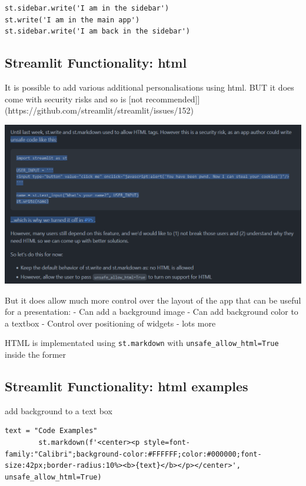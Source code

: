 \documentclass[
  letterpaper,
  DIV=11,
  numbers=noendperiod]{scrartcl}
\begin{document}
\begin{verbatim}
st.sidebar.write('I am in the sidebar')
st.write('I am in the main app')
st.sidebar.write('I am back in the sidebar')
\end{verbatim}

\hypertarget{streamlit-functionality-html}{%
\subsection{Streamlit Functionality:
html}\label{streamlit-functionality-html}}

It is possible to add various additional personalisations using html.
BUT it does come with security risks and so is {[}not
recommended{]}{]}(https://github.com/streamlit/streamlit/issues/152)

\includegraphics{ghtop_images/streamlit_html.png}

But it does allow much more control over the layout of the app that can
be useful for a presentation: - Can add a background image - Can add
background color to a textbox - Control over positioning of widgets -
lots more

HTML is implementated using \texttt{st.markdown} with
\texttt{unsafe\_allow\_html=True} inside the former

\hypertarget{streamlit-functionality-html-examples}{%
\subsection{Streamlit Functionality: html
examples}\label{streamlit-functionality-html-examples}}

add background to a text box

\begin{verbatim}
text = "Code Examples"
        st.markdown(f'<center><p style=font-family:"Calibri";background-color:#FFFFFF;color:#000000;font-size:42px;border-radius:10%><b>{text}</b></p></center>', unsafe_allow_html=True)
\end{verbatim}
\end{document}
